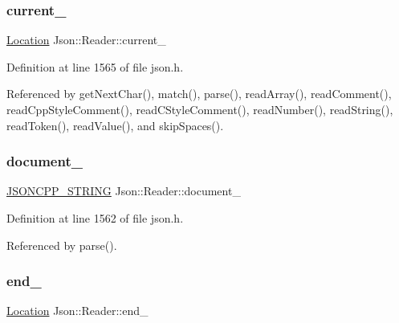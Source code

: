 \subsubsection{\texorpdfstring{current\+\_\+}{current\_}}
{\footnotesize\ttfamily \hyperlink{class_json_1_1_reader_a46795b5b272bf79a7730e406cb96375a}{Location} Json\+::\+Reader\+::current\+\_\+\hspace{0.3cm}{\ttfamily [private]}}



Definition at line 1565 of file json.\+h.



Referenced by get\+Next\+Char(), match(), parse(), read\+Array(), read\+Comment(), read\+Cpp\+Style\+Comment(), read\+C\+Style\+Comment(), read\+Number(), read\+String(), read\+Token(), read\+Value(), and skip\+Spaces().

\mbox{\label{class_json_1_1_reader_abf99e137bc92a93623dc97598702261a}} 
\subsubsection{\texorpdfstring{document\+\_\+}{document\_}}
{\footnotesize\ttfamily \hyperlink{json_8h_a1e723f95759de062585bc4a8fd3fa4be}{J\+S\+O\+N\+C\+P\+P\+\_\+\+S\+T\+R\+I\+NG} Json\+::\+Reader\+::document\+\_\+\hspace{0.3cm}{\ttfamily [private]}}



Definition at line 1562 of file json.\+h.



Referenced by parse().

\mbox{\label{class_json_1_1_reader_a714793579cbf4ee7c5a7223d2c8d77c1}} 
\subsubsection{\texorpdfstring{end\+\_\+}{end\_}}
{\footnotesize\ttfamily \hyperlink{class_json_1_1_reader_a46795b5b272bf79a7730e406cb96375a}{Location} Json\+::\+Reader\+::end\+\_\+\hspace{0.3cm}{\ttfamily [private]}}



